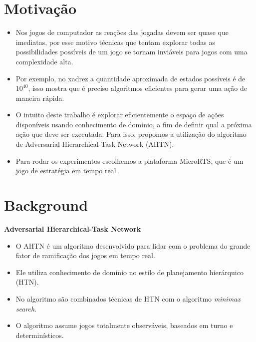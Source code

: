 \documentclass[a0,portrait]{a0poster}
\begin{document}
\begin{multicols}{2} 
	\color{NavyBlue}
	\color{Black}
	\raggedright
	\Large
	\newcommand\itemadjust{\itemsep.5em \parskip0pt \parsep0pt}
	\color{NavyBlue}
	\section*{\huge Motiva\c{c}\~ao}
	\color{Black}
	
	\begin{itemize}
		\item Nos jogos de computador as reações das jogadas devem ser quase que imediatas, por esse motivo técnicas que tentam explorar todas as possibilidades possíveis de um jogo se tornam inviáveis para jogos com uma complexidade alta.
		\item Por exemplo, no xadrez a quantidade aproximada de estados possíveis é de $10^{40}$, isso mostra que é preciso algoritmos eficientes para gerar uma ação de maneira rápida. 
		\item O intuito deste trabalho é explorar eficientemente o espaço de ações disponíveis usando conhecimento de domínio, a fim de definir qual a próxima ação que deve ser executada. Para isso, propomos a utilização do algoritmo de Adversarial Hierarchical-Task Network (AHTN).
		\item Para rodar os experimentos escolhemos a plataforma MicroRTS, que é um jogo de estratégia em tempo real. 
	\end{itemize}

	\color{NavyBlue}
	\section*{\huge Background}
	\color{Black}
		
	\textbf{Adversarial Hierarchical-Task Network}
		\begin{itemize}
			\item O AHTN é um algoritmo desenvolvido para lidar com o problema do grande fator de ramificação dos jogos em tempo real.
			\item Ele utiliza conhecimento de domínio no estilo de planejamento hierárquico (HTN).
			\item No algoritmo são combinados técnicas de HTN com o algoritmo \textit{minimax search}.
			\item O algoritmo assume jogos totalmente observáveis, baseados em turno e determinísticos. 
		\end{itemize}
		

\end{multicols}
\end{document}
